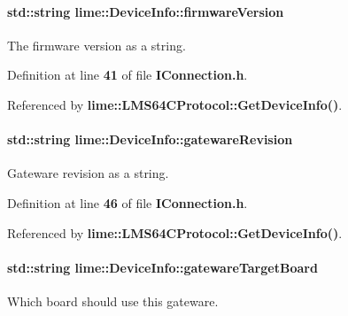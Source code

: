 \paragraph[{firmware\+Version}]{\setlength{\rightskip}{0pt plus 5cm}std\+::string lime\+::\+Device\+Info\+::firmware\+Version}\label{structlime_1_1DeviceInfo_a151d43ff932338725e54d601c05f81d0}


The firmware version as a string. 



Definition at line {\bf 41} of file {\bf I\+Connection.\+h}.



Referenced by {\bf lime\+::\+L\+M\+S64\+C\+Protocol\+::\+Get\+Device\+Info()}.

\paragraph[{gateware\+Revision}]{\setlength{\rightskip}{0pt plus 5cm}std\+::string lime\+::\+Device\+Info\+::gateware\+Revision}\label{structlime_1_1DeviceInfo_ab7533f48331331ffeda63c518518606b}


Gateware revision as a string. 



Definition at line {\bf 46} of file {\bf I\+Connection.\+h}.



Referenced by {\bf lime\+::\+L\+M\+S64\+C\+Protocol\+::\+Get\+Device\+Info()}.

\paragraph[{gateware\+Target\+Board}]{\setlength{\rightskip}{0pt plus 5cm}std\+::string lime\+::\+Device\+Info\+::gateware\+Target\+Board}\label{structlime_1_1DeviceInfo_abca451fe82d977e1ea3999fcbb47ff76}


Which board should use this gateware. 



